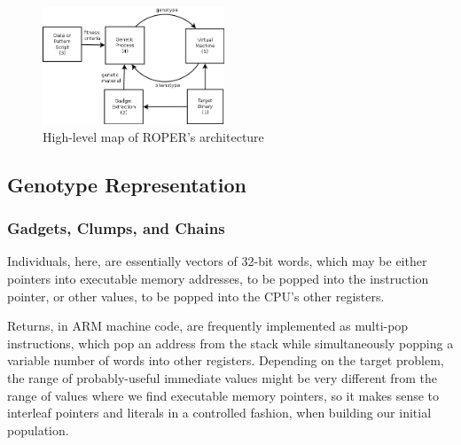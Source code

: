 \begin{figure}
  \includegraphics[width=\columnwidth,height=3.5cm]{architecture.png}
  \caption{High-level map of ROPER's architecture}
  \label{fig:architecture}
\end{figure}

\subsection{Genotype Representation}


\subsubsection{Gadgets, Clumps, and Chains}

Individuals, here, are essentially vectors of 32-bit words, which
may be either pointers into executable memory addresses, 
to be popped into the instruction pointer, or other values, 
to be popped into the CPU's other registers. 

Returns, in ARM machine code, are frequently implemented as multi-pop
instructions, which pop an address from the stack while simultaneously
popping a variable number of words into other registers. Depending on
the target problem, the range of probably-useful immediate values
might be very different from
the range of values where we find executable memory pointers, so
it makes sense to interleaf pointers and literals in
a controlled fashion, when building our initial population.

